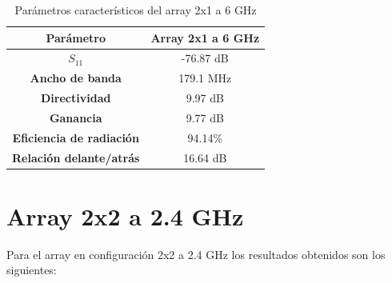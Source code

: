 \begin{table}[H]
  
   
   \small %
   \centering %
   \begin{tabular}{c c} %
   \toprule[\heavyrulewidth]\toprule[\heavyrulewidth]
   \textbf{Parámetro} & \textbf{Array 2x1 a 6 GHz} \\ 
   \midrule
   \textbf{$S_{11}$} & -76.87 dB \\
   \textbf{Ancho de banda} & 179.1 MHz \\
   \textbf{Directividad} & 9.97 dB \\
   \textbf{Ganancia} & 9.77 dB \\
   \textbf{Eficiencia de radiación} & 94.14\% \\
   \textbf{Relación delante/atrás} & 16.64 dB \\

   \bottomrule[\heavyrulewidth] 
   \end{tabular}
   
   \caption{Parámetros característicos del array 2x1 a 6 GHz} 
   \label{tab:res2x12}
\end{table}


















\section{Array 2x2 a 2.4 GHz}
\par Para el array en configuración 2x2 a 2.4 GHz los resultados obtenidos son los siguientes:

